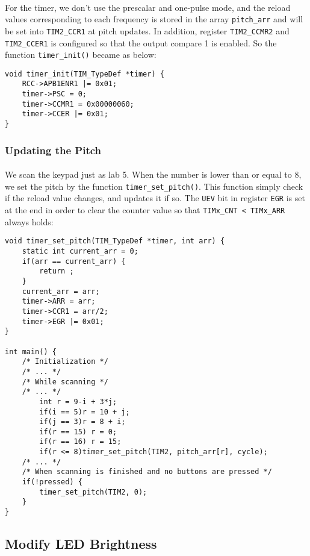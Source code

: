 \paragraph{}
For the timer, we don't use the prescalar and one-pulse mode,
and the reload values corresponding to each frequency is stored in the array \texttt{pitch\_arr} and will be set into \texttt{TIM2\_CCR1} at pitch updates.
In addition, register \texttt{TIM2\_CCMR2} and \texttt{TIM2\_CCER1} is configured so that the output compare 1 is enabled.
So the function \texttt{timer\_init()} became as below:
\begin{lstlisting}
void timer_init(TIM_TypeDef *timer) {
	RCC->APB1ENR1 |= 0x01;
	timer->PSC = 0;
	timer->CCMR1 = 0x00000060;
	timer->CCER |= 0x01;
}
\end{lstlisting}

\subsubsection{Updating the Pitch}
\paragraph{}
We scan the keypad just as lab 5.
When the number is lower than or equal to 8, we set the pitch by the function \texttt{timer\_set\_pitch()}.
This function simply check if the reload value changes, and updates it if so.
The \texttt{UEV} bit in register \texttt{EGR} is set at the end in order to clear the counter value so that \texttt{TIMx\_CNT < TIMx\_ARR} always holds:
\begin{lstlisting}
void timer_set_pitch(TIM_TypeDef *timer, int arr) {
	static int current_arr = 0;
	if(arr == current_arr) {
		return ;
	}
	current_arr = arr;
	timer->ARR = arr;
	timer->CCR1 = arr/2;
	timer->EGR |= 0x01;
}

int main() {
    /* Initialization */
    /* ... */
    /* While scanning */
    /* ... */
        int r = 9-i + 3*j;
        if(i == 5)r = 10 + j;
        if(j == 3)r = 8 + i;
        if(r == 15) r = 0;
        if(r == 16) r = 15;
        if(r <= 8)timer_set_pitch(TIM2, pitch_arr[r], cycle);
    /* ... */
    /* When scanning is finished and no buttons are pressed */
    if(!pressed) {
        timer_set_pitch(TIM2, 0);
    }
}
\end{lstlisting}

\subsection{Modify LED Brightness}
